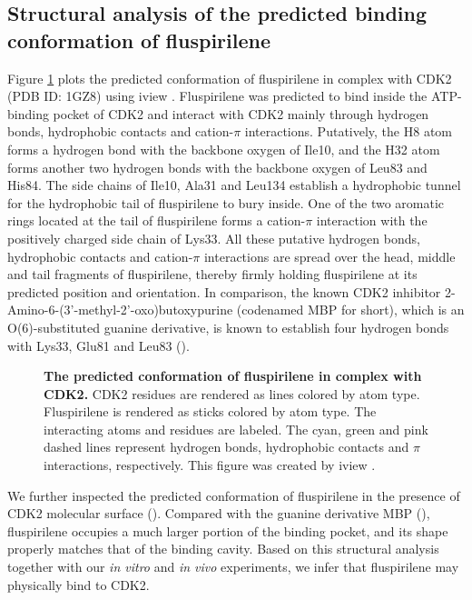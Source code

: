 \documentclass[10pt,letterpaper]{article}
\begin{document}
\subsection*{Structural analysis of the predicted binding conformation of fluspirilene}

Figure \ref{1GZ8-ZINC00537755-iv} plots the predicted conformation of fluspirilene in complex with CDK2 (PDB ID: 1GZ8) using iview \cite{1366}. Fluspirilene was predicted to bind inside the ATP-binding pocket of CDK2 and interact with CDK2 mainly through hydrogen bonds, hydrophobic contacts and cation-$\pi$ interactions. Putatively, the H8 atom forms a hydrogen bond with the backbone oxygen of Ile10, and the H32 atom forms another two hydrogen bonds with the backbone oxygen of Leu83 and His84. The side chains of Ile10, Ala31 and Leu134 establish a hydrophobic tunnel for the hydrophobic tail of fluspirilene to bury inside. One of the two aromatic rings located at the tail of fluspirilene forms a cation-$\pi$ interaction with the positively charged side chain of Lys33. All these putative hydrogen bonds, hydrophobic contacts and cation-$\pi$ interactions are spread over the head, middle and tail fragments of fluspirilene, thereby firmly holding fluspirilene at its predicted position and orientation. In comparison, the known CDK2 inhibitor 2-Amino-6-(3'-methyl-2'-oxo)butoxypurine (codenamed MBP for short), which is an O(6)-substituted guanine derivative, is known to establish four hydrogen bonds with Lys33, Glu81 and Leu83 ().

\begin{figure}%
\caption{{\bf The predicted conformation of fluspirilene in complex with CDK2.} CDK2 residues are rendered as lines colored by atom type. Fluspirilene is rendered as sticks colored by atom type. The interacting atoms and residues are labeled. The cyan, green and pink dashed lines represent hydrogen bonds, hydrophobic contacts and $\pi$ interactions, respectively. This figure was created by iview \cite{1366}.}
\label{1GZ8-ZINC00537755-iv}
\end{figure}

We further inspected the predicted conformation of fluspirilene in the presence of CDK2 molecular surface (). Compared with the guanine derivative MBP (), fluspirilene occupies a much larger portion of the binding pocket, and its shape properly matches that of the binding cavity. Based on this structural analysis together with our \textit{in vitro} and \textit{in vivo} experiments, we infer that fluspirilene may physically bind to CDK2.
\end{document}
